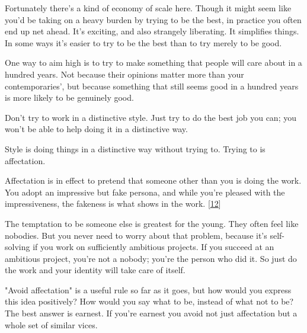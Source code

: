 Fortunately there's a kind of economy of scale
                  here. Though it might seem like you'd be taking on a heavy
                  burden by trying to be the best, in practice you often end up
                  net ahead. It's exciting, and also strangely liberating. It
                  simplifies things. In some ways it's easier to try to be the
                  best than to try merely to be good.

One way to aim
                  high is to try to make something that people will care about
                  in a hundred years. Not because their opinions matter more
                  than your contemporaries', but because something that still
                  seems good in a hundred years is more likely to be genuinely
                  good.






                  Don't try to work in a distinctive style. Just try to do the
                  best job you can; you won't be able to help doing it in a
                  distinctive way.

Style is doing things in a
                  distinctive way without trying to. Trying to is
                  affectation.

Affectation is in effect to pretend
                  that someone other than you is doing the work. You adopt an
                  impressive but fake persona, and while you're pleased with the
                  impressiveness, the fakeness is what shows in the work.
                  [\href{\#f12n}{12}]

The temptation to be someone else is greatest for
                  the young. They often feel like nobodies. But you never need
                  to worry about that problem, because it's self-solving if you
                  work on sufficiently ambitious projects. If you succeed at an
                  ambitious project, you're not a nobody; you're the person who
                  did it. So just do the work and your identity will take care
                  of itself.






                  "Avoid affectation" is a useful rule so far as it goes, but
                  how would you express this idea positively? How would you say
                  what to be, instead of what not to be? The best answer is
                  earnest. If you're earnest you avoid not just affectation but
                  a whole set of similar vices.

